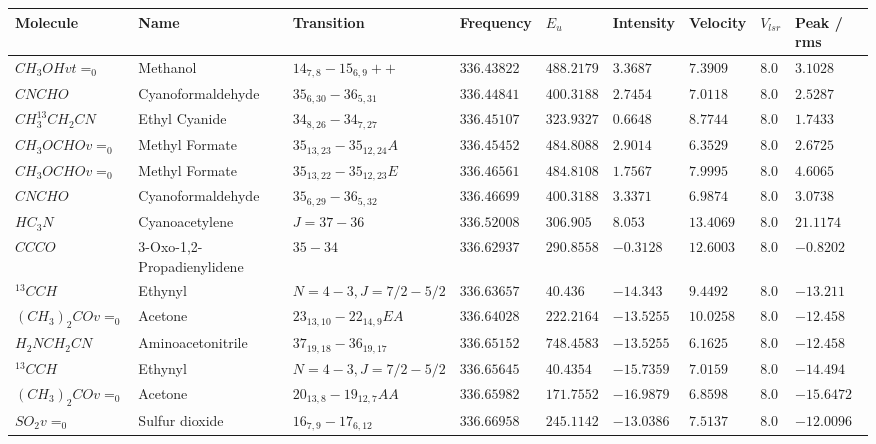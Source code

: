 \documentclass[10pt]{article}
\begin{document}
\begin{table}[htb]
\small
    \centering    
    \begin{tabular}{l l l l l l l l l} 
\hline
Molecule & Name & Transition & Frequency & $E_{{u}}$ & Intensity & Velocity & $V_{{lsr}}$ & Peak / rms \\
\hline
$CH_{3}OHvt=_{0}$ & Methanol & $14_{7,8}-15_{6,9}++$ & $336.43822$ & $488.2179$ & $3.3687$ & $7.3909$ & $8.0$ & $3.1028$\\
$CNCHO$ & Cyanoformaldehyde & $35_{6,30}-36_{5,31}$ & $336.44841$ & $400.3188$ & $2.7454$ & $7.0118$ & $8.0$ & $2.5287$\\
$CH_{3}^{13}CH_{2}CN$ & Ethyl Cyanide & $34_{8,26}-34_{7,27}$ & $336.45107$ & $323.9327$ & $0.6648$ & $8.7744$ & $8.0$ & $1.7433$\\
$CH_{3}OCHOv=_{0}$ & Methyl Formate & $35_{13,23}-35_{12,24}A$ & $336.45452$ & $484.8088$ & $2.9014$ & $6.3529$ & $8.0$ & $2.6725$\\
$CH_{3}OCHOv=_{0}$ & Methyl Formate & $35_{13,22}-35_{12,23}E$ & $336.46561$ & $484.8108$ & $1.7567$ & $7.9995$ & $8.0$ & $4.6065$\\
$CNCHO$ & Cyanoformaldehyde & $35_{6,29}-36_{5,32}$ & $336.46699$ & $400.3188$ & $3.3371$ & $6.9874$ & $8.0$ & $3.0738$\\
$HC_{3}N$ & Cyanoacetylene & $J=37-36$ & $336.52008$ & $306.905$ & $8.053$ & $13.4069$ & $8.0$ & $21.1174$\\
$CCCO$ & 3-Oxo-1,2-Propadienylidene & $35-34$ & $336.62937$ & $290.8558$ & $-0.3128$ & $12.6003$ & $8.0$ & $-0.8202$\\
$^{13}CCH$ & Ethynyl & $N=4-3,J=7/2-5/2$ & $336.63657$ & $40.436$ & $-14.343$ & $9.4492$ & $8.0$ & $-13.211$\\
$(CH_{3})_{2}COv=_{0}$ & Acetone & $23_{13,10}-22_{14,9}EA$ & $336.64028$ & $222.2164$ & $-13.5255$ & $10.0258$ & $8.0$ & $-12.458$\\
$H_{2}NCH_{2}CN$ & Aminoacetonitrile & $37_{19,18}-36_{19,17}$ & $336.65152$ & $748.4583$ & $-13.5255$ & $6.1625$ & $8.0$ & $-12.458$\\
$^{13}CCH$ & Ethynyl & $N=4-3,J=7/2-5/2$ & $336.65645$ & $40.4354$ & $-15.7359$ & $7.0159$ & $8.0$ & $-14.494$\\
$(CH_{3})_{2}COv=_{0}$ & Acetone & $20_{13,8}-19_{12,7}AA$ & $336.65982$ & $171.7552$ & $-16.9879$ & $6.8598$ & $8.0$ & $-15.6472$\\
$SO_{2}v=_{0}$ & Sulfur dioxide & $16_{7,9}-17_{6,12}$ & $336.66958$ & $245.1142$ & $-13.0386$ & $7.5137$ & $8.0$ & $-12.0096$\\
\hline


    \end{tabular}
\end{table}
\end{document}
